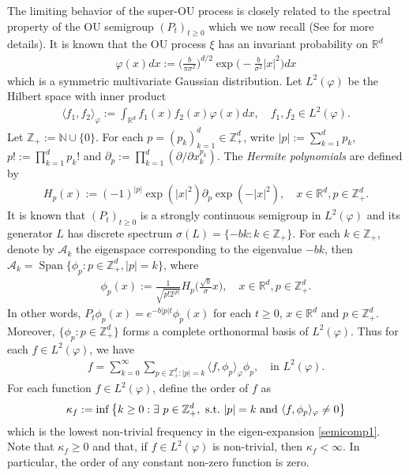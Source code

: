 \documentclass[12pt,a4paper]{amsart}
\theoremstyle{plain}
\theoremstyle{definition}
\numberwithin{equation}{section}
\begin{document}
The limiting behavior of the super-OU process is closely related to the spectral property of the OU semigroup $(P_t)_{t\geq 0}$ which we now recall (See \cite{MetafunePallaraPriola2002Spectrum} for more details).
It is known that the OU process $\xi$ has an invariant probability on $\mathbb R^d$
\begin{align}
  \label{invariantdensity}
  \varphi(x)dx
  :=\Big (\frac{b}{\pi \sigma^2}\Big )^{d/2}\exp \Big(-\frac{b}{\sigma^2}|x|^2 \Big)dx
\end{align}
which is a   symmetric multivariate Gaussian distribution.
Let $L^2(\varphi)$ be the Hilbert space with inner product
\begin{align}
  \langle f_1, f_2 \rangle_{\varphi}
  := \int_{\mathbb R^d}f_1(x)f_2(x)\varphi(x) dx, \quad f_1,f_2 \in L^2(\varphi).
\end{align}
Let $\mathbb Z_+ := \mathbb N\cup\{0\}$.
For each $p = (p_k)_{k = 1}^d \in \mathbb{Z}_+^{d}$, write $|p|:=\sum_{k=1}^d p_k$, $p!:= \prod_{k= 1}^d p_k!$ and $\partial_p:= \prod_{k = 1}^d(\partial/\partial x_k^{p_k})$.
The \emph{Hermite polynomials} are defined by
\begin{align}
  H_p(x)
  :=(-1)^{|p|}\exp(|x|^2) \partial_p \exp(-|x|^2)
  , \quad x\in \mathbb R^d, p \in \mathbb{Z}_+^{d}.
\end{align}
It is known that $(P_t)_{t\geq 0}$ is a strongly continuous semigroup in $L^2(\varphi)$ and its generator $L$ has discrete spectrum $\sigma(L)= \{-bk: k \in \mathbb Z_+\}$.
For each $k \in \mathbb Z_+$, denote by $\mathcal{A}_k$ the eigenspace corresponding to the eigenvalue $-bk$, then $ \mathcal{A}_k = \operatorname{Span} \{\phi_p : p\in \mathbb Z_+^d, |p|=k\}$, where
\begin{align}
  \label{eigenfunction}
  \phi_p(x)
  := \frac{1}{\sqrt{ p! 2^{|p|} }} H_p \Big(\frac{ \sqrt{b} }{\sigma}x \Big)
  , \quad x\in \mathbb R^d, p\in \mathbb Z_+^d.
\end{align}
In other words,
\(  
  P_t\phi_p(x)
  = e^{-b|p|t}\phi_p(x)
\)
for each $t\geq 0$, $x\in \mathbb R^d$ and $p\in \mathbb Z_+^d$.
Moreover, $\{\phi_p: p \in \mathbb Z_+^d\}$ forms a complete orthonormal basis of $L^2(\varphi)$.
Thus for each $f\in L^2(\varphi)$, we have
\begin{align}
  \label{semicomp1}
  f
  = \sum_{k=0}^{\infty}\sum_{p\in \mathbb Z_+^d:|p|=k}\langle f, \phi_p \rangle_{\varphi} \phi_p
  , \quad \text{in~} L^2(\varphi).
\end{align}
For each function $f\in L^2(\varphi)$, define the order of $f$ as
\[
  \kappa_f
  := \inf \left \{k\geq 0: \exists ~ p\in \mathbb Z_+^d , {\rm ~s.t.~} |p|=k {\rm ~and~}  \langle f, \phi_p \rangle_{\varphi}\neq 0\right \}
\]
which is the lowest non-trivial frequency in the eigen-expansion \eqref{semicomp1}.
Note that $ \kappa_f\geq 0$ and that, if $f\in L^2(\varphi)$ is non-trivial, then $\kappa_f<\infty$.
In particular, the order of any constant non-zero function is zero.
\end{document}
